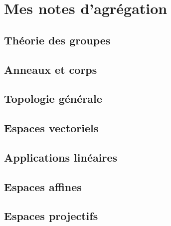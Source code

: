 



\makeindex
\makenomenclature





    

\tableofcontents



\part{Mes notes d'agrégation}

\chapter{Théorie des groupes}


\chapter{Anneaux et corps}



\chapter{Topologie générale}


\chapter{Espaces vectoriels}




\chapter{Applications linéaires}        \label{Chap_appl_lin}


\chapter{Espaces affines}


\chapter{Espaces projectifs}


